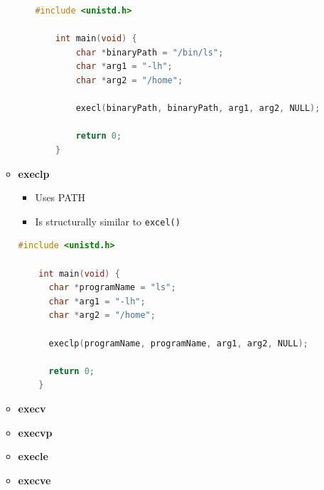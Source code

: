 \documentclass[12pt]{article}
\begin{document}
\begin{enumerate}[1.]
\begin{itemize}
\begin{itemize}
\begin{lstlisting}[language=c]
    #include <unistd.h>

    int main(void) {
        char *binaryPath = "/bin/ls";
        char *arg1 = "-lh";
        char *arg2 = "/home";

        execl(binaryPath, binaryPath, arg1, arg2, NULL);

        return 0;
    }
\end{lstlisting}

        \end{itemize}

        \item \textbf{execlp}

        \begin{itemize}
            \item Uses PATH
            \item Is structurally similar to \texttt{excel()}
        \end{itemize}


\begin{lstlisting}[language=c]
    #include <unistd.h>

    int main(void) {
      char *programName = "ls";
      char *arg1 = "-lh";
      char *arg2 = "/home";

      execlp(programName, programName, arg1, arg2, NULL);

      return 0;
    }
\end{lstlisting}


        \item \textbf{execv}
        \item \textbf{execvp}
        \item \textbf{execle}
        \item \textbf{execve}
    \end{itemize}


\end{enumerate}
\end{document}
